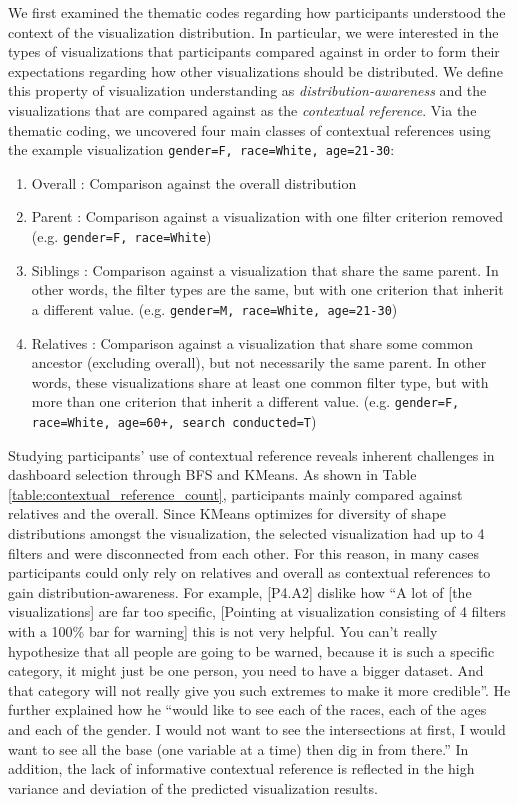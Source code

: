 \npar We first examined the thematic codes regarding how participants understood the context of the visualization distribution. In particular, we were interested in the types of visualizations that participants compared against in order to form their expectations regarding how other visualizations should be distributed. We define this property of visualization understanding as \textit{distribution-awareness} and the visualizations that are compared against as the \textit{contextual reference}. Via the thematic coding, we uncovered four main classes of contextual references using the example visualization \texttt{gender=F, race=White, age=21-30}:
\begin{enumerate}
	\item Overall : Comparison against the overall distribution
	\item Parent : Comparison against a visualization with one filter criterion removed (e.g. \texttt{gender=F, race=White})
	\item Siblings : Comparison against a visualization that share the same parent. In other words, the filter types are the same, but with one criterion that inherit a different value. (e.g. \texttt{gender=M, race=White, age=21-30})
	\item Relatives : Comparison against a visualization that share some common ancestor (excluding overall), but not necessarily the same parent. In other words, these visualizations share at least one common filter type, but with more than one criterion that inherit a different value. (e.g. \texttt{gender=F, race=White, age=60+, search conducted=T})
\end{enumerate}
Studying participants' use of contextual reference reveals inherent challenges in dashboard selection through BFS and KMeans. As shown in Table \ref{table:contextual_reference_count}, participants mainly compared against relatives and the overall. Since KMeans optimizes for diversity of shape distributions amongst the visualization, the selected visualization had up to 4 filters and were disconnected from each other.%
For this reason, in many cases participants could only rely on relatives and overall as contextual references to gain distribution-awareness. For example, [P4.A2] dislike how ``A lot of [the visualizations] are far too specific, [Pointing at visualization consisting of 4 filters with a 100\% bar for warning] this is not very helpful. You can't really hypothesize that all people are going to be warned, because it is such a specific category, it might just be one person, you need to have a bigger dataset. And that category will not really give you such extremes to make it more credible''. He further explained how he ``would like to see each of the races, each of the ages and each of the gender. I would not want to see the intersections at first, I would want to see all the base (one variable at a time) then dig in from there.'' In addition, the lack of informative contextual reference is reflected in the high variance and deviation of the predicted visualization results.
